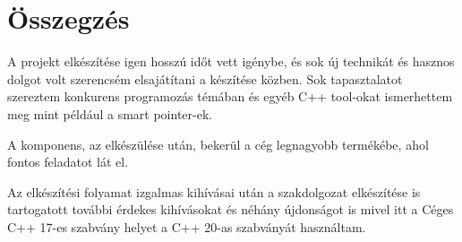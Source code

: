 \chapter{Összegzés}
\label{ch:sum}

A projekt elkészítése igen hosszú időt vett igénybe, és sok új technikát és hasznos dolgot volt szerencsém elsajátítani a készítése közben. Sok tapasztalatot szereztem konkurens programozás témában és egyéb C++ tool-okat ismerhettem meg mint például a smart pointer-ek.

A komponens, az elkészülése után, bekerül a cég legnagyobb termékébe, ahol fontos feladatot lát el.

Az elkészítési folyamat izgalmas kihívásai után a szakdolgozat elkészítése is tartogatott további érdekes kihívásokat és néhány újdonságot is mivel itt a Céges C++ 17-es szabvány helyet a C++ 20-as szabványát használtam.